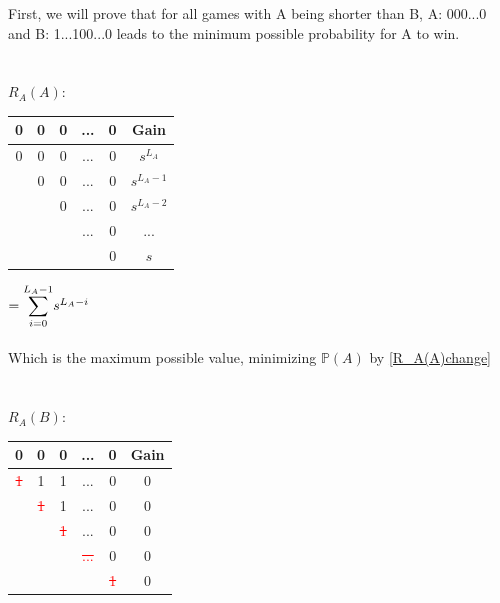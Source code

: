 \documentclass[english,12pt,a4paper,final]{article}
\begin{document}
First, we will prove that for all games with A being shorter than B, A: 000...0 and B: 1...100...0 leads to the minimum possible probability for A to win.
\\\\\\
${R_A(A)}$:
\begin{tabular}{|ccccc|c|}
	\hline
	0 & 0 & 0 & ... & 0 & Gain \\
	\hline
	
	\textcolor{OliveGreen}{0} & \textcolor{OliveGreen}{0} & \textcolor{OliveGreen}{0} & \textcolor{OliveGreen}{...} & \textcolor{OliveGreen}{0} & $s^{L_A}$\\
	
	& \textcolor{OliveGreen}{0} & \textcolor{OliveGreen}{0} & \textcolor{OliveGreen}{...} & \textcolor{OliveGreen}{0} & $s^{L_A-1}$\\
	
	&  & \textcolor{OliveGreen}{0} & \textcolor{OliveGreen}{...} & \textcolor{OliveGreen}{0} & $s^{L_A-2}$ \\
	
	&  &  & \textcolor{OliveGreen}{...} & \textcolor{OliveGreen}{0} & ... \\
	
	&  &  &  & \textcolor{OliveGreen}{0} & $s$ \\
	\hline
\end{tabular}
$=\mathlarger\sum_{i=0}^{L_A-1}s^{L_A-i}$
\\\\
Which is the maximum possible value, minimizing $\mathbb{P}(A)$ by \eqref{R_A(A)change} 
\\\\\\
${R_A(B)}$:
\begin{tabular}{|ccccc|c|}
	\hline
	0 & 0 & 0 & ... & 0 & Gain \\
	\hline
	
	\textcolor{red}{\sout{1}} & 1 & 1 & ... & 0 & $0$\\
	
	& \textcolor{red}{\sout{1}} & 1 & ... & 0 & $0$\\
	
	&  & \textcolor{red}{\sout{1}} & ... & 0 & $0$\\
	
	&  &  & \textcolor{red}{\sout{...}} & 0 & $0$ \\
	
	&  &  &  & \textcolor{red}{\sout{1}} & $0$ \\
	\hline
\end{tabular}
\end{document}
